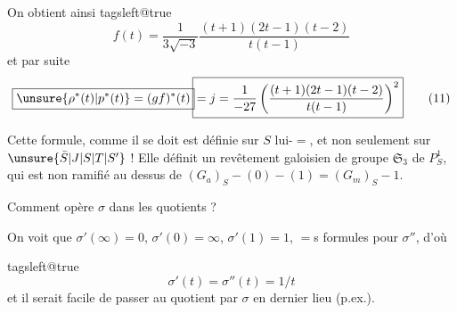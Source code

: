 On obtient ainsi
\begingroup\csname tagsleft@true\endcsname
\[
f(t)=\frac{1}{3\sqrt{-3}}\frac{(t+1)(2t-1)(t-2)}{t(t-1)} \tag*{(10)}
\]
\endgroup
et par suite
\[
\boxed{\unsure{\rho^*(t)|p^*(t)}=(gf)^*(t)}\!\boxed{=j=\frac{1}{-27}\left(\frac{(t+1)(2t-1)(t-2)}{t(t-1)}\right)^2} \tag*{(11)}
\]

Cette formule, comme il se doit est définie sur $S$ lui-$=$, et non seulement sur $\unsure{\bar S|J|S|T|S'}$ ! Elle définit un revêtement galoisien de groupe $\mathfrak S_3$ de  $P^1_S$,  qui est non ramifié au dessus de $(G_a)_S-(0)-(1)=(G_m)_S-1$.


Comment opère $\sigma$ dans les quotients ?

\noindent\begin{minipage}[t]{.21\linewidth}\vspace{0pt}\scriptsize
{}
\end{minipage}\hfill\begin{minipage}[t]{.74\linewidth}\vspace{0pt}

On voit que $\sigma'(\infty)=0$, $\sigma'(0)=\infty$, $\sigma'(1)=1$,  $=$s formules pour $\sigma''$, d'où 

\begingroup\csname tagsleft@true\endcsname
\[
\sigma'(t)=\sigma''(t)=1/t \tag*{(11)}
\]
\endgroup
et il serait facile de passer au quotient par $\sigma$  en dernier lieu (p.ex.).
\end{minipage}
